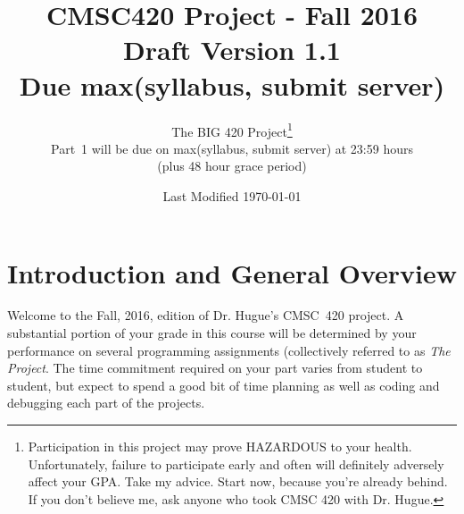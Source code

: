 \documentclass[12pt]{article}
\title{CMSC420 Project - Fall 2016\\ Draft Version 1.1\\ Due max(syllabus, submit server)}
\date{Last Modified \today}
\author{The BIG 420 Project\footnote{Participation in this project may
    prove HAZARDOUS to your health. Unfortunately, failure to
    participate early and often will definitely adversely affect your
    GPA.  Take my advice. Start now, because you're already behind. If
    you don't believe me, ask anyone who took  CMSC 420 with Dr.
    Hugue.}\\Part~1 will be due on max(syllabus, submit server) at 23:59 hours\\(plus 48 hour grace period)}
\begin{document}
\maketitle
\bigskip

\begin{latexonly}
  \tableofcontents
\end{latexonly}

\section{Introduction and General Overview}







Welcome to the Fall, 2016,  edition of Dr. Hugue's CMSC~420 
project.
A substantial portion of your grade in this course will be determined
by your performance on several programming assignments (collectively
referred to as 
\emph{The Project}.  The time commitment required on your part varies from
student to student, but expect to spend a good bit of time planning as
well as coding and debugging each part of the projects.
\end{document}
